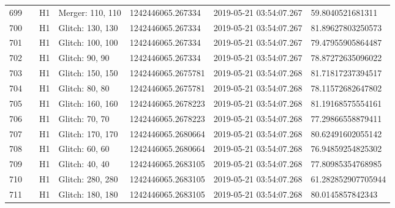 \begin{longtable}{lllllll}
699  &                                                    &       H1 &  Merger: 110, 110 &   1242446065.267334 &  2019-05-21 03:54:07.267 &    59.8040521681311 \\
700  &                                                    &       H1 &  Glitch: 130, 130 &   1242446065.267334 &  2019-05-21 03:54:07.267 &   81.89627803250573 \\
701  &                                                    &       H1 &  Glitch: 100, 100 &   1242446065.267334 &  2019-05-21 03:54:07.267 &   79.47955905864487 \\
702  &                                                    &       H1 &    Glitch: 90, 90 &   1242446065.267334 &  2019-05-21 03:54:07.267 &   78.87272635096022 \\
703  &                                                    &       H1 &  Glitch: 150, 150 &  1242446065.2675781 &  2019-05-21 03:54:07.268 &   81.71817237394517 \\
704  &                                                    &       H1 &    Glitch: 80, 80 &  1242446065.2675781 &  2019-05-21 03:54:07.268 &   78.11572682647802 \\
705  &                                                    &       H1 &  Glitch: 160, 160 &  1242446065.2678223 &  2019-05-21 03:54:07.268 &   81.19168575554161 \\
706  &                                                    &       H1 &    Glitch: 70, 70 &  1242446065.2678223 &  2019-05-21 03:54:07.268 &   77.29866558879411 \\
707  &                                                    &       H1 &  Glitch: 170, 170 &  1242446065.2680664 &  2019-05-21 03:54:07.268 &   80.62491602055142 \\
708  &                                                    &       H1 &    Glitch: 60, 60 &  1242446065.2680664 &  2019-05-21 03:54:07.268 &   76.94859254825302 \\
709  &                                                    &       H1 &    Glitch: 40, 40 &  1242446065.2683105 &  2019-05-21 03:54:07.268 &   77.80985354768985 \\
710  &                                                    &       H1 &  Glitch: 280, 280 &  1242446065.2683105 &  2019-05-21 03:54:07.268 &  61.282852907705944 \\
711  &                                                    &       H1 &  Glitch: 180, 180 &  1242446065.2683105 &  2019-05-21 03:54:07.268 &    80.0145857842343 \\

\end{longtable}
